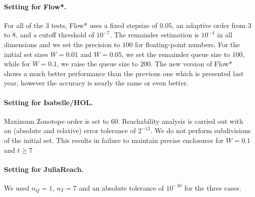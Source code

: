 \documentclass[EPiC]{easychair}
\begin{document}
\paragraph{Setting for Flow*.}
For all of the $3$ tests, Flow* uses a fixed stepsize of $0.05$, an adaptive order from $3$ to $8$, and a cutoff threshold of $10^{-7}$. The remainder estimation is $10^{-4}$ in all dimensions and we set the precision to $100$ for floating-point numbers. For the initial set sizes $W = 0.01$ and $W = 0.05$, we set the remainder queue size to $100$, while for $W=0.1$, we raise the queue size to $200$. The new version of Flow* shows a much better performance than the previous one which is presented last year, however the accuracy is nearly the same or even better.



\paragraph{Setting for Isabelle/HOL.}
Maximum Zonotope order is set to $60$. Reachability analysis is carried out with an (absolute and relative) error tolerance of $2^{-12}$. We do not perform subdivisions of the initial set. This results in failure to maintain precise enclosures for $W=0.1$ and $t \ge 7$


\paragraph{Setting for JuliaReach.} We used $n_Q=1$, $n_T=7$ and an absolute tolerance of $10^{-10}$ for the three cases.
\end{document}
